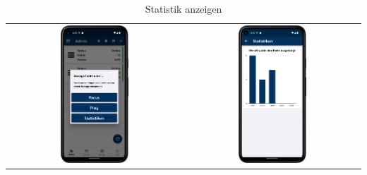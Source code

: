 \vspace{1cm}
\begin{table}[htbp]
  \centering
  \begin{tabular}{cc}
    \includegraphics[width=0.4\textwidth]{FLUTTER/images/ZB/status_page_selector.png} &
    \includegraphics[width=0.4\textwidth]{FLUTTER/images/ZB/stats_page.png} \\
  \end{tabular}
  \label{tab:example}
  \captionsetup{type=figure}
  \caption{Statistik anzeigen}
\end{table}

